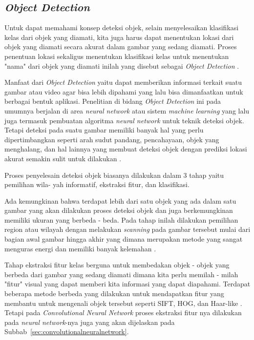 \subsection{\emph{Object Detection}}
\label{sec:objectdetection}

\par Untuk dapat memahami konsep deteksi objek, selain menyelesaikan klasifikasi kelas dari objek yang diamati, kita juga harus dapat
menentukan lokasi dari objek yang diamati secara akurat dalam gambar yang sedang diamati. Proses penentuan lokasi sekaligus menentukan
klasifikasi kelas untuk menentukan "nama" dari objek yang diamati inilah yang disebut sebagai \emph{Object Detection} \cite{felzenszwalb2010object}.

\par Manfaat dari \emph{Object Detection} yaitu dapat memberikan informasi terkait suatu gambar atau video agar bisa lebih dipahami yang lalu bisa dimanfaatkan
untuk berbagai bentuk aplikasi. Penelitian di bidang \emph{Object Detection} ini pada umumnya berjalan di area \emph{neural network} atau sistem \emph{machine learning}
yang lalu juga termasuk pembuatan algoritma \emph{neural network} untuk teknik deteksi objek. Tetapi deteksi pada suatu gambar memiliki banyak
hal yang perlu dipertimbangkan seperti arah sudut pandang, pencahayaan, objek yang menghalang, dan hal lainnya yang membuat
deteksi objek dengan prediksi lokasi akurat semakin sulit untuk dilakukan \cite{zhao2019object} \cite{girshick2014rich}.

\par Proses penyelesain deteksi objek biasanya dilakukan dalam 3 tahap yaitu pemilihan wila- yah informatif, ekstraksi fitur, dan
klasifikasi.

\par Ada kemungkinan bahwa terdapat lebih dari satu objek yang ada dalam satu gambar yang akan dilakukan proses deteksi objek dan
juga berkemungkinan memiliki ukuran yang berbeda - beda. Pada tahap inilah dilakukan pemilihan region atau wilayah dengan melakukan \emph{scanning} pada gambar tersebut mulai
dari bagian awal gambar hingga akhir yang dimana merupakan metode yang sangat menguras energi dan memiliki banyak kelemahan \cite{zhao2019object}.

\par Tahap ekstraksi fitur kelas berguna untuk membedakan objek - objek yang berbeda dari gambar yang sedang diamati dimana kita perlu
memilah - milah "fitur" visual yang dapat memberi kita informasi yang dapat diapahami. Terdapat beberapa metode berbeda yang dilakukan
untuk mendapatkan fitur yang membantu untuk mengenali objek tersebut seperti SIFT, HOG, dan Haar-like \cite{zhao2019object}. Tetapi pada \emph{Convolutional Neural Network}
proses ekstraksi fitur nya dilakukan pada \emph{neural network}-nya juga yang akan dijelaskan pada Subbab~\ref{sec:convolutionalneuralnetwork}.

